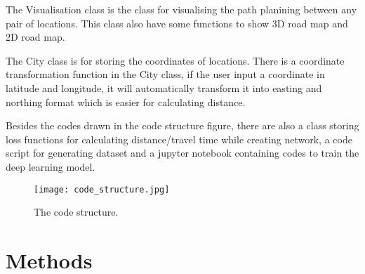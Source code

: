 \documentclass[final-report]{report-template}
\begin{document}
The Visualisation class is the class for visualising the path planining between any pair of locations.
This class also have some functions to show 3D road map and 2D road map.

The City class is for storing the coordinates of locations. There is a coordinate transformation function in the City class, 
if the user input a coordinate in latitude and longitude, it will automatically transform it into easting and northing format 
which is easier for calculating distance.

Besides the codes drawn in the code structure figure, 
there are also a class storing loss functions for calculating distance/travel time while creating network,
a code script for generating dataset and a jupyter notebook containing codes to train the deep learning model.
\begin{figure}[H]
    \begin{center}
        \texttt{[image: code\_structure.jpg]}
    \end{center}
    \caption{\label{fig:code_struc} The code structure.}
\end{figure}
\section {Methods}
\end{document}
